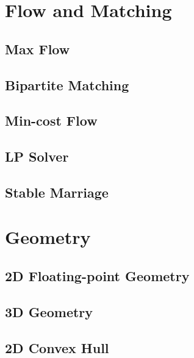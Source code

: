 \section{Flow and Matching}
\subsection{Max Flow}
\raggedbottom
\hrulefill
\subsection{Bipartite Matching}
\raggedbottom
\hrulefill
\subsection{Min-cost Flow}
\raggedbottom
\hrulefill
\subsection{LP Solver}
\raggedbottom
\hrulefill
\subsection{Stable Marriage}
\raggedbottom
\hrulefill

\section{Geometry}
\subsection{2D Floating-point Geometry}
\raggedbottom
\hrulefill
\subsection{3D Geometry}
\raggedbottom
\hrulefill
\subsection{2D Convex Hull}
\raggedbottom
\hrulefill
